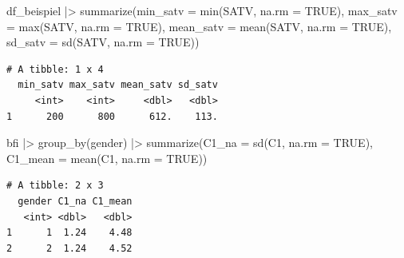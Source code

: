 \documentclass[
  letterpaper,
  DIV=11,
  numbers=noendperiod]{scrreprt}
\newenvironment{Shaded}{\begin{snugshade}}{\end{snugshade}}
\newcommand{\AttributeTok}[1]{\textcolor[rgb]{0.40,0.45,0.13}{#1}}
\newcommand{\ConstantTok}[1]{\textcolor[rgb]{0.56,0.35,0.01}{#1}}
\newcommand{\FunctionTok}[1]{\textcolor[rgb]{0.28,0.35,0.67}{#1}}
\newcommand{\NormalTok}[1]{\textcolor[rgb]{0.00,0.23,0.31}{#1}}
\newcommand{\SpecialCharTok}[1]{\textcolor[rgb]{0.37,0.37,0.37}{#1}}
\begin{document}
\begin{tcolorbox}[enhanced jigsaw, opacitybacktitle=0.6, left=2mm, colback=white, rightrule=.15mm, title=\textcolor{quarto-callout-tip-color}{\faLightbulb}\hspace{0.5em}{Lösung: Übung \texttt{summarize()}}, breakable, leftrule=.75mm, colframe=quarto-callout-tip-color-frame, toptitle=1mm, toprule=.15mm, titlerule=0mm, arc=.35mm, bottomtitle=1mm, colbacktitle=quarto-callout-tip-color!10!white, coltitle=black, bottomrule=.15mm, opacityback=0]

\begin{Shaded}
\begin{Highlighting}[]
\NormalTok{df\_beispiel }\SpecialCharTok{|\textgreater{}} 
  \FunctionTok{summarize}\NormalTok{(}\AttributeTok{min\_satv =} \FunctionTok{min}\NormalTok{(SATV, }\AttributeTok{na.rm =} \ConstantTok{TRUE}\NormalTok{),}
            \AttributeTok{max\_satv =} \FunctionTok{max}\NormalTok{(SATV, }\AttributeTok{na.rm =} \ConstantTok{TRUE}\NormalTok{),}
            \AttributeTok{mean\_satv =} \FunctionTok{mean}\NormalTok{(SATV, }\AttributeTok{na.rm =} \ConstantTok{TRUE}\NormalTok{),}
            \AttributeTok{sd\_satv =} \FunctionTok{sd}\NormalTok{(SATV, }\AttributeTok{na.rm =} \ConstantTok{TRUE}\NormalTok{))}
\end{Highlighting}
\end{Shaded}

\begin{verbatim}
# A tibble: 1 x 4
  min_satv max_satv mean_satv sd_satv
     <int>    <int>     <dbl>   <dbl>
1      200      800      612.    113.
\end{verbatim}

\begin{Shaded}
\begin{Highlighting}[]
\NormalTok{bfi }\SpecialCharTok{|\textgreater{}} \FunctionTok{group\_by}\NormalTok{(gender) }\SpecialCharTok{|\textgreater{}} 
  \FunctionTok{summarize}\NormalTok{(}\AttributeTok{C1\_na =} \FunctionTok{sd}\NormalTok{(C1, }\AttributeTok{na.rm =} \ConstantTok{TRUE}\NormalTok{),}
            \AttributeTok{C1\_mean =} \FunctionTok{mean}\NormalTok{(C1, }\AttributeTok{na.rm =} \ConstantTok{TRUE}\NormalTok{))}
\end{Highlighting}
\end{Shaded}

\begin{verbatim}
# A tibble: 2 x 3
  gender C1_na C1_mean
   <int> <dbl>   <dbl>
1      1  1.24    4.48
2      2  1.24    4.52
\end{verbatim}

\end{tcolorbox}
\end{document}

